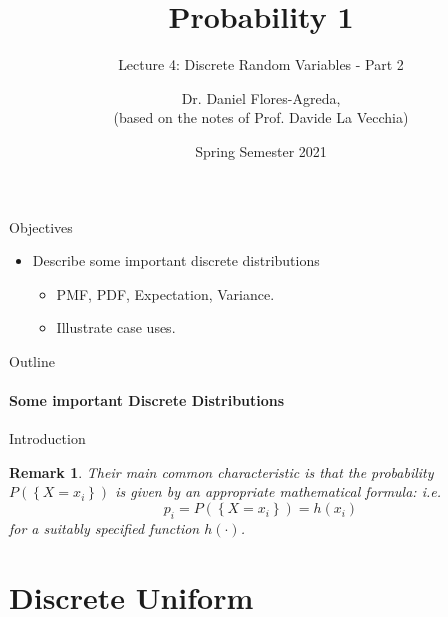 \documentclass[smaller]{beamer}\usepackage[]{graphicx}\usepackage[]{color}
\newtheorem{remark}{Remark}[section]
\begin{document}
\title[S110015]{Probability 1}
\subtitle{Lecture 4: Discrete Random Variables - Part 2}
\author[Flores-Agreda, La Vecchia]{Dr. Daniel Flores-Agreda, \\[0.5em] \tiny{(based on the notes of Prof. Davide La Vecchia)}}
\date{Spring Semester 2021}

\begin{frame}
\titlepage
\end{frame}

\begin{frame}{Objectives}
  \begin{itemize}
  \item Describe some important discrete distributions
  \bigskip
  \begin{itemize}
  \item PMF, PDF, Expectation, Variance.
  \bigskip
  \item Illustrate case uses.
  \end{itemize}
  \end{itemize}
\end{frame}

\begin{frame}{Outline}
\framesubtitle{Some important Discrete Distributions}
  \tableofcontents
\end{frame}


\begin{frame}{Introduction}
  \begin{remark}
  Their main common characteristic is that the probability $P\left(\left\{ X=x_i\right\}\right)$ is given by an appropriate mathematical formula: i.e.
  $$
  p_{i}=P\left(\left\{ X=x_i\right\}\right)=h(x_{i})
  $$
  for a suitably specified function $h(\cdot)$.
  \end{remark}
\end{frame}

\section{Discrete Uniform}
\end{document}
